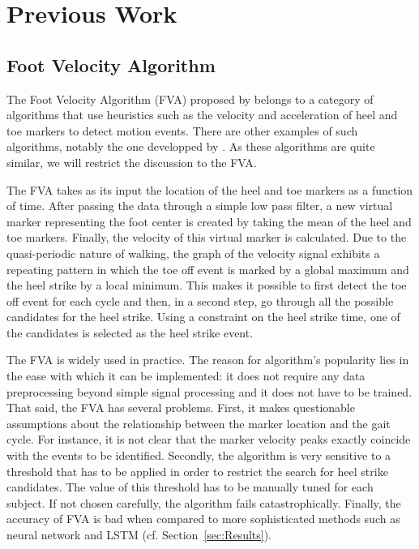 \documentclass{acm_proc_article-sp}
\begin{document}
\section{Previous Work}
\label{sec:Previous Work}

\subsection{Foot Velocity Algorithm}
\label{sub:Foot Velocity Algorithm}

The Foot Velocity Algorithm (FVA) proposed by
\citet{Oconnor2007}
belongs to a category of algorithms that use heuristics such as the velocity
and acceleration of heel and toe markers to detect motion events.
There are other examples of such algorithms, notably the one developped by
\citet{Hreljac2000}.
As these algorithms are quite similar, we will restrict the discussion
to the FVA.

The FVA takes as its input the location of the heel and toe markers as a
function of time.
After passing the data through a simple low pass filter,
a new virtual marker representing the foot center is created by taking the mean
of the heel and toe markers.
Finally, the velocity of this virtual marker is calculated.
Due to the quasi-periodic nature of walking, the graph of the velocity signal
exhibits a repeating pattern in which the toe off event is marked by a global
maximum and the heel strike by a local minimum.
This makes it possible to first detect the toe off event for each cycle and
then, in a second step, go through all the possible candidates for the heel
strike.
Using a constraint on the heel strike time, one of the candidates is selected
as the heel strike event.

The FVA is widely used in practice.
The reason for algorithm's popularity lies in the ease with which it can be
implemented:
it does not require any data preprocessing beyond simple signal processing and
it does not have to be trained.
That said, the FVA has several problems.
First, it makes questionable assumptions about the relationship between the
marker location and the gait cycle.
For instance, it is not clear that the marker velocity peaks exactly coincide
with the events to be identified.
Secondly, the algorithm is very sensitive to a threshold that has to be applied
in order to restrict the search for heel strike candidates.
The value of this threshold has to be manually tuned for each subject.
If not chosen carefully, the algorithm fails catastrophically.
Finally, the accuracy of FVA is bad when compared to more sophisticated methods
such as neural network and LSTM
(cf. Section~\ref{sec:Results}).
\end{document}
